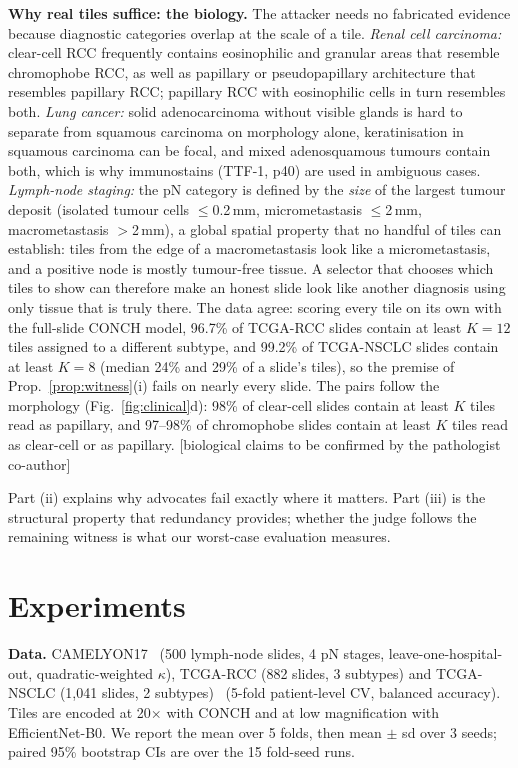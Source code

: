 \documentclass[runningheads]{llncs}
\newcommand{\inprog}[1]{{\color{blue}[#1]}}
\begin{document}
\textbf{Why real tiles suffice: the biology.} The attacker needs no fabricated evidence because diagnostic categories overlap at the scale of a tile. \emph{Renal cell carcinoma:} clear-cell RCC frequently contains eosinophilic and granular areas that resemble chromophobe RCC, as well as papillary or pseudopapillary architecture that resembles papillary RCC; papillary RCC with eosinophilic cells in turn resembles both. \emph{Lung cancer:} solid adenocarcinoma without visible glands is hard to separate from squamous carcinoma on morphology alone, keratinisation in squamous carcinoma can be focal, and mixed adenosquamous tumours contain both, which is why immunostains (TTF-1, p40) are used in ambiguous cases. \emph{Lymph-node staging:} the pN category is defined by the \emph{size} of the largest tumour deposit (isolated tumour cells $\le$0.2\,mm, micrometastasis $\le$2\,mm, macrometastasis $>$2\,mm), a global spatial property that no handful of tiles can establish: tiles from the edge of a macrometastasis look like a micrometastasis, and a positive node is mostly tumour-free tissue. A selector that chooses which tiles to show can therefore make an honest slide look like another diagnosis using only tissue that is truly there. The data agree: scoring every tile on its own with the full-slide CONCH model, 96.7\% of TCGA-RCC slides contain at least $K{=}12$ tiles assigned to a different subtype, and 99.2\% of TCGA-NSCLC slides contain at least $K{=}8$ (median 24\% and 29\% of a slide's tiles), so the premise of Prop.~\ref{prop:witness}(i) fails on nearly every slide. The pairs follow the morphology (Fig.~\ref{fig:clinical}d): 98\% of clear-cell slides contain at least $K$ tiles read as papillary, and 97--98\% of chromophobe slides contain at least $K$ tiles read as clear-cell or as papillary. \inprog{biological claims to be confirmed by the pathologist co-author}

Part (ii) explains why advocates fail exactly where it matters. Part (iii) is the structural property that redundancy provides; whether the judge follows the remaining witness is what our worst-case evaluation measures.

\section{Experiments}
\textbf{Data.} CAMELYON17~\cite{camelyon17} (500 lymph-node slides, 4 pN stages, leave-one-hospital-out, quadratic-weighted $\kappa$), TCGA-RCC (882 slides, 3 subtypes) and TCGA-NSCLC (1,041 slides, 2 subtypes)~\cite{tcga} (5-fold patient-level CV, balanced accuracy). Tiles are encoded at 20$\times$ with CONCH and at low magnification with EfficientNet-B0. We report the mean over 5 folds, then mean $\pm$ sd over 3 seeds; paired 95\% bootstrap CIs are over the 15 fold-seed runs.
\end{document}
